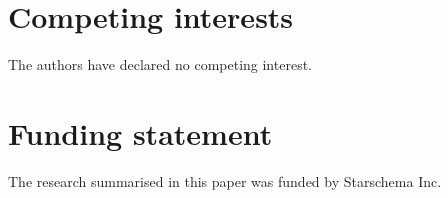 \documentclass[fleqn,10pt]{SelfArx} %
\begin{document}
\section*{Competing interests} %


The authors have declared no competing interest.

\section*{Funding statement} %


The research summarised in this paper was funded by Starschema Inc.






\end{document}
